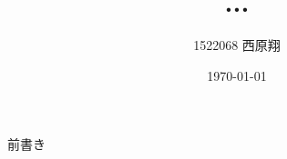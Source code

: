 \documentclass[11pt,dvipdfmx,a4paper]{jsreport}
\title{...}
\author{1522068 西原翔}
\date{\today}
\begin{document}

\maketitle
\tableofcontents

前書き

% 




\end{document}
